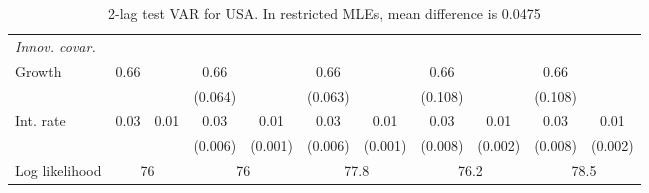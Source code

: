 \begin{table}[htbp]
\begin{tabular}{@{\extracolsep{4pt}}lcccccccccc@{}}
\rule{0pt}{4ex} \emph{Innov. covar.}  	 & 	 & 	 & 	 & 	 & 	 & 	 & 	 & 	 & 	 &\\ 
\quad Growth 	 &0.66 	 &  	 & 0.66 	 &  	 & 0.66 	 &  	 & 0.66 	 &  	 & 0.66 	 & 	 \\ 
 		 &  	 &  	 & (0.064) 	 &  	 & (0.063) 	 &  	 & (0.108) 	 &  	 & (0.108) 	 &  	 \\ 
\quad Int. rate 	 &0.03 	 & 0.01 	 & 0.03 	 & 0.01 	 & 0.03 	 & 0.01 	 & 0.03 	 & 0.01 	 & 0.03 	 & 0.01	 \\ 
 		 &  	 &  	 & (0.006) 	 & (0.001) 	 & (0.006) 	 & (0.001) 	 & (0.008) 	 & (0.002) 	 & (0.008) 	 & (0.002) 	 \\ 
 \hline \rule{0pt}{4ex} 
  Log likelihood 	 &\multicolumn{2}{c}{76} 	 & \multicolumn{2}{c}{76} 	 & \multicolumn{2}{c}{77.8} 	 & \multicolumn{2}{c}{76.2} 	 & \multicolumn{2}{c}{78.5}\\ 

 \hline 	\end{tabular}		\caption{2-lag test VAR for USA. In restricted MLEs, mean difference is 0.0475}
		\label{tab:USA2lag}

\end{table}